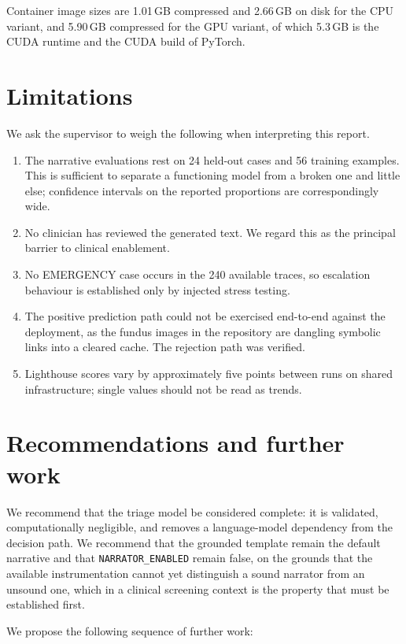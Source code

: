 \documentclass[11pt,a4paper]{article}
\newcommand{\code}[1]{\texttt{\small #1}}
\begin{document}
Container image sizes are 1.01\,GB compressed and 2.66\,GB on disk for the CPU
variant, and 5.90\,GB compressed for the GPU variant, of which 5.3\,GB is the
CUDA runtime and the CUDA build of PyTorch.

\section{Limitations}

We ask the supervisor to weigh the following when interpreting this report.

\begin{enumerate}[leftmargin=*,itemsep=3pt]
\item The narrative evaluations rest on 24 held-out cases and 56 training
examples. This is sufficient to separate a functioning model from a broken one
and little else; confidence intervals on the reported proportions are
correspondingly wide.
\item No clinician has reviewed the generated text. We regard this as the
principal barrier to clinical enablement.
\item No EMERGENCY case occurs in the 240 available traces, so escalation
behaviour is established only by injected stress testing.
\item The positive prediction path could not be exercised end-to-end against the
deployment, as the fundus images in the repository are dangling symbolic links
into a cleared cache. The rejection path was verified.
\item Lighthouse scores vary by approximately five points between runs on shared
infrastructure; single values should not be read as trends.
\end{enumerate}

\section{Recommendations and further work}

We recommend that the triage model be considered complete: it is validated,
computationally negligible, and removes a language-model dependency from the
decision path. We recommend that the grounded template remain the default
narrative and that \code{NARRATOR\_ENABLED} remain false, on the grounds that
the available instrumentation cannot yet distinguish a sound narrator from an
unsound one, which in a clinical screening context is the property that must be
established first.

We propose the following sequence of further work:
\end{document}
